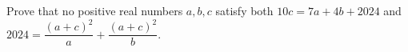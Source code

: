 Prove that no positive real numbers $a,b,c$ satisfy both $10c=7a+4b+2024$ and $2024=\dfrac{(a+c)^2}{a}+\dfrac{(a+c)^2}{b}$.
